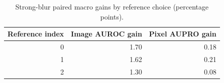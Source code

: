 \begin{table}[htbp]
\caption{Strong-blur paired macro gains by reference choice (percentage points).}
\label{tab:reference_sensitivity}
\begin{tabular}{rrr}
\toprule
Reference index & Image AUROC gain & Pixel AUPRO gain \\
\midrule
0 & 1.70 & 0.18 \\
1 & 1.62 & 0.21 \\
2 & 1.30 & 0.08 \\
\bottomrule
\end{tabular}
\end{table}
